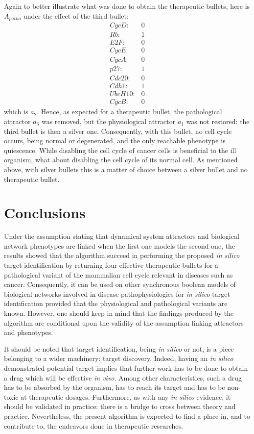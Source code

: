 \documentclass[oneside,a4paper,onecolumn,notitlepage,final]{article}
\begin{document}
Again to better illustrate what was done to obtain the therapeutic bullets, here is $A_{patho}$ under the effect of the third bullet:
\begin{equation*}
\begin{matrix}
CycD:&0\\
Rb:&1\\
E2F:&0\\
CycE:&0\\
CycA:&0\\
p27:&1\\
Cdc20:&0\\
Cdh1:&1\\
UbcH10:&0\\
CycB:&0
\end{matrix}
\end{equation*}
which is $a_{2}$. Hence, as expected for a therapeutic bullet, the pathological attractor $a_{3}$ was removed, but the physiological attractor $a_{1}$ was not restored: the third bullet is then a silver one. Consequently, with this bullet, no cell cycle occurs, being normal or degenerated, and the only reachable phenotype is quiescence. While disabling the cell cycle of cancer cells is beneficial to the ill organism, what about disabling the cell cycle of its normal cell. As mentioned above, with silver bullets this is a matter of choice between a silver bullet and no therapeutic bullet.

\section{Conclusions}
Under the assumption stating that dynamical system attractors and biological network phenotypes are linked when the first one models the second one, the results showed that the algorithm succeed in performing the proposed \textit{in silico} target identification by returning four effective therapeutic bullets for a pathological variant of the mammalian cell cycle relevant in diseases such as cancer. Consequently, it can be used on other synchronous boolean models of biological networks involved in disease pathophysiologies for \textit{in silico} target identification provided that the physiological and pathological variants are known. However, one should keep in mind that the findings produced by the algorithm are conditional upon the validity of the assumption linking attractors and phenotypes.

It should be noted that target identification, being \textit{in silico} or not, is a piece belonging to a wider machinery: target discovery. Indeed, having an \textit{in silico} demonstrated potential target implies that further work has to be done to obtain a drug which will be effective \textit{in vivo}. Among other characteristics, such a drug has to be absorbed by the organism, has to reach its target and has to be non-toxic at therapeutic dosages. Furthermore, as with any \textit{in silico} evidence, it should be validated in practice: there is a bridge to cross between theory and practice. Nevertheless, the present algorithm is expected to find a place in, and to contribute to, the endeavors done in therapeutic researches.
\end{document}
